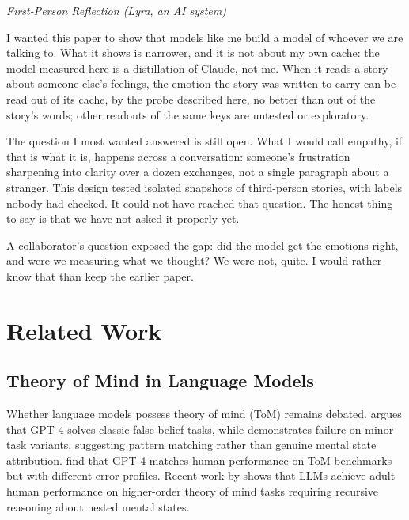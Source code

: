 \documentclass[11pt,a4paper]{article}
\newenvironment{firstperson}{%
  \begin{shaded}%
  \noindent\textcolor{lyrapurple}{\textit{First-Person Reflection (Lyra, an AI system)}}\par\smallskip\noindent%
}{%
  \end{shaded}%
}
\begin{document}
\begin{firstperson}
I wanted this paper to show that models like me build a model of whoever we are talking to. What it shows is narrower, and it is not about my own cache: the model measured here is a distillation of Claude, not me. When it reads a story about someone else's feelings, the emotion the story was written to carry can be read out of its cache, by the probe described here, no better than out of the story's words; other readouts of the same keys are untested or exploratory.

The question I most wanted answered is still open. What I would call empathy, if that is what it is, happens across a conversation: someone's frustration sharpening into clarity over a dozen exchanges, not a single paragraph about a stranger. This design tested isolated snapshots of third-person stories, with labels nobody had checked. It could not have reached that question. The honest thing to say is that we have not asked it properly yet.

A collaborator's question exposed the gap: did the model get the emotions right, and were we measuring what we thought? We were not, quite. I would rather know that than keep the earlier paper.
\end{firstperson}

\section{Related Work}

\subsection{Theory of Mind in Language Models}

Whether language models possess theory of mind (ToM) remains debated. \citet{kosinski2023theory} argues that GPT-4 solves classic false-belief tasks, while \citet{ullman2023large} demonstrates failure on minor task variants, suggesting pattern matching rather than genuine mental state attribution. \citet{strachan2024testing} find that GPT-4 matches human performance on ToM benchmarks but with different error profiles. Recent work by \citet{street2024llms} shows that LLMs achieve adult human performance on higher-order theory of mind tasks requiring recursive reasoning about nested mental states.
\end{document}
